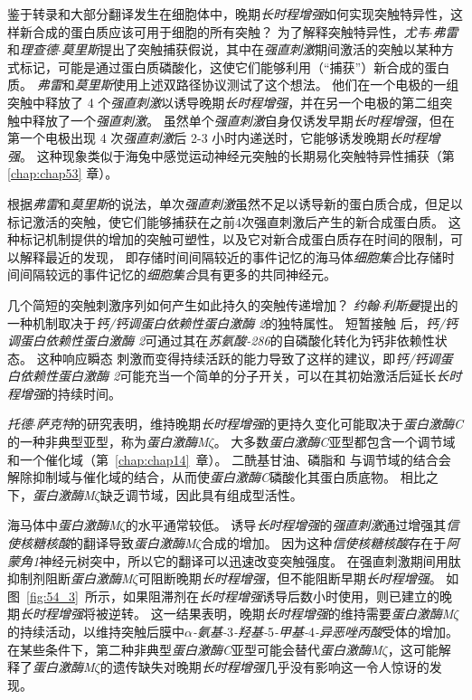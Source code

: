 鉴于转录和大部分翻译发生在细胞体中，晚期\textit{长时程增强}如何实现突触特异性，这样新合成的蛋白质应该可用于细胞的所有突触？
为了解释突触特异性，\textit{尤韦$\cdot$弗雷}和\textit{理查德$\cdot$莫里斯}提出了突触捕获假说，其中在\textit{强直刺激}期间激活的突触以某种方式标记，可能是通过蛋白质磷酸化，这使它们能够利用（“捕获”）新合成的蛋白质。
\textit{弗雷}和\textit{莫里斯}使用上述双路径协议测试了这个想法。
他们在一个电极的一组突触中释放了 4 个\textit{强直刺激}以诱导晚期\textit{长时程增强}，并在另一个电极的第二组突触中释放了一个\textit{强直刺激}。
虽然单个\textit{强直刺激}自身仅诱发早期\textit{长时程增强}，但在第一个电极出现 4 次\textit{强直刺激}后 2-3 小时内递送时，它能够诱发晚期\textit{长时程增强}。
这种现象类似于海兔中感觉运动神经元突触的长期易化突触特异性捕获（第 \ref{chap:chap53} 章）。


根据\textit{弗雷}和\textit{莫里斯}的说法，单次\textit{强直刺激}虽然不足以诱导新的蛋白质合成，但足以标记激活的突触，使它们能够捕获在之前4次强直刺激后产生的新合成蛋白质。
这种标记机制提供的增加的突触可塑性，以及它对新合成蛋白质存在时间的限制，可以解释最近的发现，
即存储时间间隔较近的事件记忆的海马体\textit{细胞集合}比存储时间间隔较远的事件记忆的\textit{细胞集合}具有更多的共同神经元。


几个简短的突触刺激序列如何产生如此持久的突触传递增加？
\textit{约翰$\cdot$利斯曼}提出的一种机制取决于\textit{钙/钙调蛋白依赖性蛋白激酶 2}的独特属性。
短暂接触  后，\textit{钙/钙调蛋白依赖性蛋白激酶 2}可通过其在\textit{苏氨酸-286}的自磷酸化转化为钙非依赖性状态。
这种响应瞬态  刺激而变得持续活跃的能力导致了这样的建议，即\textit{钙/钙调蛋白依赖性蛋白激酶 2}可能充当一个简单的分子开关，可以在其初始激活后延长\textit{长时程增强}的持续时间。


\textit{托德$\cdot$萨克特}的研究表明，维持晚期\textit{长时程增强}的更持久变化可能取决于\textit{蛋白激酶C}的一种非典型亚型，称为\textit{蛋白激酶M$\zeta$}。
大多数\textit{蛋白激酶C}亚型都包含一个调节域和一个催化域（第~\ref{chap:chap14}~章）。
二酰基甘油、磷脂和  与调节域的结合会解除抑制域与催化域的结合，从而使\textit{蛋白激酶C}磷酸化其蛋白质底物。
相比之下，\textit{蛋白激酶M$\zeta$}缺乏调节域，因此具有组成型活性。


海马体中\textit{蛋白激酶M$\zeta$}的水平通常较低。
诱导\textit{长时程增强}的\textit{强直刺激}通过增强其\textit{信使核糖核酸}的翻译导致\textit{蛋白激酶M$\zeta$}合成的增加。
因为这种\textit{信使核糖核酸}存在于\textit{阿蒙角1}神经元树突中，所以它的翻译可以迅速改变突触强度。
在强直刺激期间用肽抑制剂阻断\textit{蛋白激酶M$\zeta$}可阻断晚期\textit{长时程增强}，但不能阻断早期\textit{长时程增强}。
如图~\ref{fig:54_3}~所示，如果阻滞剂在\textit{长时程增强}诱导后数小时使用，则已建立的晚期\textit{长时程增强}将被逆转。
这一结果表明，晚期\textit{长时程增强}的维持需要\textit{蛋白激酶M$\zeta$}的持续活动，以维持突触后膜中\textit{$\alpha$-氨基-}3\textit{-羟基-}5\textit{-甲基-}4\textit{-异恶唑丙酸}受体的增加。
在某些条件下，第二种非典型\textit{蛋白激酶C}亚型可能会替代\textit{蛋白激酶M$\zeta$}，这可能解释了\textit{蛋白激酶M$\zeta$}的遗传缺失对晚期\textit{长时程增强}几乎没有影响这一令人惊讶的发现。


